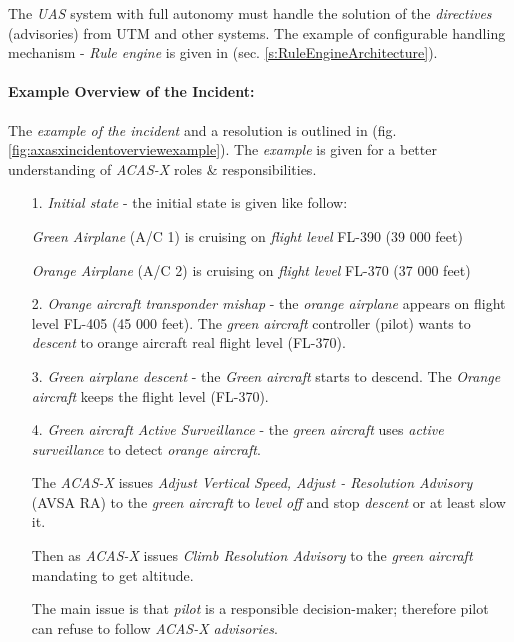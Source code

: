 \begin{note}
    The \emph{UAS} system with full autonomy must handle the solution of the \emph{directives} (advisories) from UTM and other systems. The example of configurable handling mechanism - \emph{Rule engine} is given in (sec. \ref{s:RuleEngineArchitecture}).
\end{note}

\paragraph{Example Overview of the Incident:} The \emph{example of the incident} and  a resolution is outlined in (fig. \ref{fig:axasxincidentoverviewexample}). The \emph{example} is given for a better understanding of \emph{ACAS-X} roles \& responsibilities. 

\begin{itemize}
    \item[1.] \emph{Initial state} - the initial state is given like follow:
    
    \emph{Green Airplane} (A/C 1) is cruising on \emph{flight level} FL-390 (39 000 feet)
    
    \emph{Orange Airplane} (A/C 2) is cruising on \emph{flight level} FL-370 (37 000 feet)
    
    \item[2.] \emph{Orange aircraft transponder mishap} - the \emph{orange airplane} appears on flight level FL-405 (45 000 feet).  The \emph{green aircraft} controller (pilot) wants to \emph{descent} to orange aircraft real flight level (FL-370). 
    
    \item[3.] \emph{Green airplane descent} - the \emph{Green aircraft} starts to descend. The \emph{Orange aircraft} keeps the flight level (FL-370). 
    
    \item[4.] \emph{Green aircraft Active Surveillance} - the \emph{green aircraft} uses \emph{active surveillance} to detect \emph{orange aircraft}. 
    
    The \emph{ACAS-X} issues \emph{Adjust Vertical Speed, Adjust - Resolution Advisory} (AVSA RA) to  the \emph{green aircraft} to \emph{level off} and stop \emph{descent} or at least slow it.
    
    Then as \emph{ACAS-X} issues \emph{Climb Resolution Advisory} to the \emph{green aircraft} mandating to get altitude. 
    
    \begin{note}
        The main issue is that \emph{pilot} is a responsible decision-maker; therefore pilot can refuse to follow \emph{ACAS-X advisories}.
    \end{note}
    

\end{itemize}
